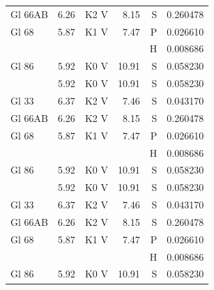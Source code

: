\documentclass{aa}
\begin{document}
{\begin{longtable}{lllrrr}
Gl 66AB  & 6.26 & K2 V & 8.15 & S & 0.260478\\
Gl 68    & 5.87 & K1 V & 7.47 & P & 0.026610\\
         &      &      &      & H & 0.008686\\
Gl 86    & 5.92 & K0 V & 10.91& S & 0.058230\\            & 5.92 & K0 V & 10.91& S & 0.058230\\
Gl 33    & 6.37 & K2 V & 7.46 & S & 0.043170\\
Gl 66AB  & 6.26 & K2 V & 8.15 & S & 0.260478\\
Gl 68    & 5.87 & K1 V & 7.47 & P & 0.026610\\
         &      &      &      & H & 0.008686\\
Gl 86    & 5.92 & K0 V & 10.91& S & 0.058230\\            & 5.92 & K0 V & 10.91& S & 0.058230\\
Gl 33    & 6.37 & K2 V & 7.46 & S & 0.043170\\
Gl 66AB  & 6.26 & K2 V & 8.15 & S & 0.260478\\
Gl 68    & 5.87 & K1 V & 7.47 & P & 0.026610\\
         &      &      &      & H & 0.008686\\
Gl 86    & 5.92 & K0 V & 10.91& S & 0.058230\\   
\end{longtable}
}
\end{document}
